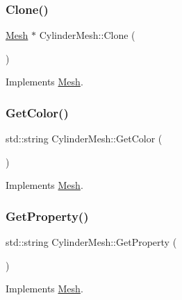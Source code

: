 \subsubsection{\texorpdfstring{Clone()}{Clone()}}
{\footnotesize\ttfamily \mbox{\hyperlink{class_mesh}{Mesh}} $\ast$ Cylinder\+Mesh\+::\+Clone (\begin{DoxyParamCaption}{ }\end{DoxyParamCaption})\hspace{0.3cm}{\ttfamily [virtual]}}



Implements \mbox{\hyperlink{class_mesh_a11928acab4066671d10e9e531ad96fb6}{Mesh}}.

\mbox{\label{class_cylinder_mesh_a7415f90e56862321e09bcf6088a335a0}} 
\subsubsection{\texorpdfstring{GetColor()}{GetColor()}}
{\footnotesize\ttfamily std\+::string Cylinder\+Mesh\+::\+Get\+Color (\begin{DoxyParamCaption}{ }\end{DoxyParamCaption})\hspace{0.3cm}{\ttfamily [virtual]}}



Implements \mbox{\hyperlink{class_mesh_aa413c0ccbc081aa50a2946e1c6930b0c}{Mesh}}.

\mbox{\label{class_cylinder_mesh_a508ae2bf6117bc949b05d8b99b8aad34}} 
\subsubsection{\texorpdfstring{GetProperty()}{GetProperty()}}
{\footnotesize\ttfamily std\+::string Cylinder\+Mesh\+::\+Get\+Property (\begin{DoxyParamCaption}{ }\end{DoxyParamCaption})\hspace{0.3cm}{\ttfamily [virtual]}}



Implements \mbox{\hyperlink{class_mesh_a94464260c2d9ad3c274f72b472fc9a2f}{Mesh}}.

